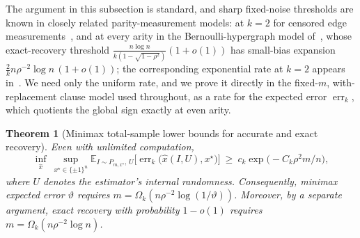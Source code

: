 \documentclass[11pt]{article}
\newtheorem{theorem}{Theorem}[section]
\theoremstyle{definition}
\theoremstyle{remark}
\newcommand{\E}{\mathbb E}
\newcommand{\1}{\mathbf 1}
\newcommand{\xstar}{{x^\star}}
\DeclareMathOperator{\err}{err}
\numberwithin{equation}{section}
\begin{document}
The argument in this subsection is standard, and sharp fixed-noise
thresholds are known in closely related parity-measurement models: at
$k=2$ for censored edge measurements~\cite{ABBS,HWX}, and at every
arity in the Bernoulli-hypergraph model of~\cite{ALS}, whose
exact-recovery threshold
$\frac{n\log n}{k(1-\sqrt{1-\rho^2})}(1+o(1))$ has small-bias
expansion $\tfrac2kn\rho^{-2}\log n\,(1+o(1))$; the corresponding
exponential rate at $k=2$ appears in~\cite{XJL}.  We need only the
uniform rate, and we prove it directly in the fixed-$m$,
with-replacement clause model used throughout, as a rate for the
expected error $\err_k$, which quotients the global sign exactly at
even arity.

\begin{theorem}[Minimax total-sample lower bounds for accurate and
exact recovery]\label{thm:minimax}
Even with unlimited computation,
\begin{equation}\label{eq:minimax}
 \inf_{\widehat x}\ \sup_{\xstar\in\{\pm1\}^n}
 \E_{I\sim P_{m,\xstar},\,U}
 \bigl[\err_k\bigl(\widehat x(I,U),\xstar\bigr)\bigr]
 \ \ge\ c_k\exp\bigl(-C_k\rho^2m/n\bigr),
\end{equation}
where $U$ denotes the estimator's internal randomness.  Consequently,
minimax expected error $\vartheta$ requires
$m=\Omega_k(n\rho^{-2}\log(1/\vartheta))$.  Moreover, by a separate
argument, exact recovery with probability $1-o(1)$ requires
$m=\Omega_k(n\rho^{-2}\log n)$.
\end{theorem}
\end{document}
